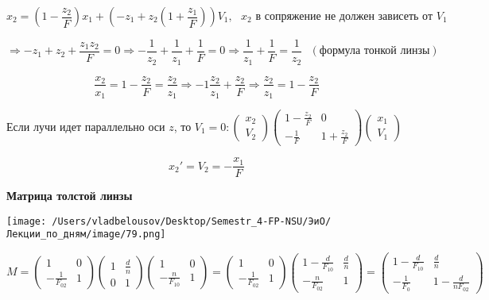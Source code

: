 \documentclass[12pt, a4paper]{report}
\begin{document}
\[ x_2 = \left(  1 - \frac{z_2}{F }  \right) x_1 + \left(- z_1 + z_2 \left( 1 + \frac{z_1}{F }  \right) \right)V_1 , \text{ } x_2 \text{ в сопряжение не должен зависеть от } V_1   \] 


\[ \Rightarrow -z_1 + z_2 + \frac{z_1 z_2 }{F } = 0 \Rightarrow - \frac{1}{z_2 } + \frac{1}{z_1} + \frac{1}{F } = 0 \Rightarrow \frac{1}{z_1 } + \frac{1}{F } = \frac{1}{z_2 } \text{ }  (\text{формула тонкой линзы} )     \] 

\[\frac{x_2}{x_1 } = 1 - \frac{z_2}{F }  =\frac{z_2}{z_1}   \Rightarrow - 1 \frac{z_2}{ z_1 } + \frac{z_2}{F }  \Rightarrow \frac{z_2}{z_1 } = 1 - \frac{z_2}{F}    \] 

Если лучи идет параллельно оси \( z \), то \(\displaystyle  V_1  = 0:   \begin{pmatrix}
x_2\\
V_2 
\end{pmatrix}
\begin{pmatrix}
    1- \frac{z_2}{F }   & 0\\
    - \frac{1}{F }  & 1+ \frac{z_2}{F}  
\end{pmatrix}
\begin{pmatrix}
    x_1 \\
    V_1
\end{pmatrix}
\) 

\[ x_2 ' = V_2 = - \frac{x_1}{F }  \] 

\textbf{Матрица толстой линзы } 

\begin{center}
    \texttt{[image: /Users/vladbelousov/Desktop/Semestr\_4-FP-NSU/ЭиО/Лекции\_по\_дням/image/79.png]}
\end{center} 
\[ M = \begin{pmatrix}
    1  & 0\\
    - \frac{1}{F_{02} }  & 1
\end{pmatrix} 
\begin{pmatrix}
    1  & \frac{d}{n} \\
    0  & 1
\end{pmatrix}
\begin{pmatrix}
    1  & 0\\
    - \frac{n}{F_{10} }  & 1
\end{pmatrix}  = 
\begin{pmatrix}
    1  & 0\\
    - \frac{1}{F_{02} }  & 1
\end{pmatrix} 
\begin{pmatrix}
1 - \frac{d}{F_{10}}  & \frac{d}{n} \\
-\frac{n}{F_{02}}  & 1
\end{pmatrix}=
\begin{pmatrix}
    1 - \frac{d}{F_{10}}  & \frac{d}{n} \\
    - \frac{1}{F_0}   & 1- \frac{d}{n F_{02}} 
\end{pmatrix} 
\] 
\end{document}
